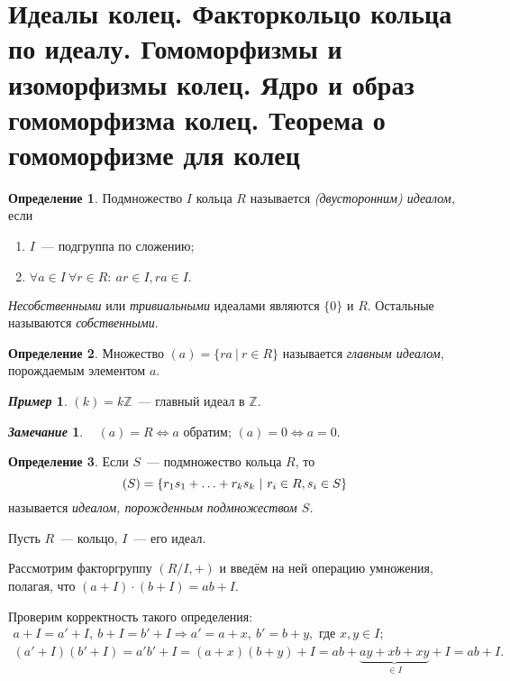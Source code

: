 \documentclass[a4paper, 14pt]{extarticle}
\newcommand{\n}{\par}
\newcommand{\integers}{\mathbb{Z}}
\theoremstyle{definition}
\newtheorem*{exmpl*}{\textit{Пример}}
\newtheorem*{remark}{\textit{Замечание}}
\newtheorem{definition}{Определение}
\theoremstyle{plain}
\numberwithin{theorem}{section}
\numberwithin{definition}{section}
\numberwithin{statement}{section}
\numberwithin{lemma}{section}
\numberwithin{consequence}{section}
\begin{document}
	\section{Идеалы колец. Факторкольцо кольца по идеалу. Гомоморфизмы и изоморфизмы колец. Ядро и образ гомоморфизма колец. Теорема о гомоморфизме для колец}
	\setcounter{definition}{0}
	\begin{definition}
		Подмножество $I$ кольца $R$ называется \textit{(двусторонним) идеалом,} если
		\begin{enumerate}
			\setlength\itemsep{0.1em}
			\item $I$~--- подгруппа по сложению;
			\item $\forall a \in I \ \forall r \in R{:} \ ar \in I, ra \in I.$
		\end{enumerate} \n
		\textit{Несобственными} или \textit{тривиальными} идеалами являются $\{0\}$ и $R$. Остальные называются \textit{собственными}.
	\end{definition}
	\begin{definition}
		Множество ${(a) = \{ra \ | \ r \in R\}}$ называется \textit{главным идеалом}, порождаемым элементом $a.$
	\end{definition}
	\begin{exmpl*}
		${(k) = k\integers}$~--- главный идеал в $\integers.$
	\end{exmpl*}
	\begin{remark}
		\ \newline
		$(a) = R \Longleftrightarrow a$ обратим; \newline
		$(a) = 0 \Longleftrightarrow a = 0.$
	\end{remark}
	\begin{definition}
		Если $S$~--- подмножество кольца $R$, то
		\begin{equation*}
			(S) = \{r_1 s_1 + \mathellipsis + r_k s_k \ | \ r_i \in R, s_i \in S\}
		\end{equation*}
		называется \textit{идеалом, порожденным подмножеством $S$.}
	\end{definition}
	Пусть $R$~--- кольцо, $I$~--- его идеал. \n
	Рассмотрим факторгруппу $(R/I, +)$ и введём на ней операцию умножения, полагая, что ${(a + I) \cdot (b + I) = ab + I.}$ \n
	Проверим корректность такого определения:
	\begin{equation*}
		\begin{gathered}
			{a + I = a' + I, \ b + I = b' + I \Longrightarrow a' = a + x, \ b' = b + y, \text{ где } x, y \in I;} \\
			{(a' + I)(b' + I) =  a'b' + I =(a + x)(b + y) + I = ab + \underbrace{ay + xb + xy}_{\in I} + I = ab + I.}
		\end{gathered}
	\end{equation*}
\end{document}
